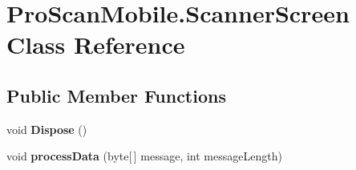 \hypertarget{class_pro_scan_mobile_1_1_scanner_screen}{\section{Pro\-Scan\-Mobile.\-Scanner\-Screen Class Reference}
\label{class_pro_scan_mobile_1_1_scanner_screen}
}
\subsection*{Public Member Functions}
\begin{DoxyCompactItemize}
\item 
\hypertarget{class_pro_scan_mobile_1_1_scanner_screen_af9589000b217a6fb2406ceab88007866}{void {\bfseries Dispose} ()}\label{class_pro_scan_mobile_1_1_scanner_screen_af9589000b217a6fb2406ceab88007866}

\item 
\hypertarget{class_pro_scan_mobile_1_1_scanner_screen_a56aa170a775179044764775cdc467e22}{void {\bfseries process\-Data} (byte\mbox{[}$\,$\mbox{]} message, int message\-Length)}\label{class_pro_scan_mobile_1_1_scanner_screen_a56aa170a775179044764775cdc467e22}

\end{DoxyCompactItemize}
